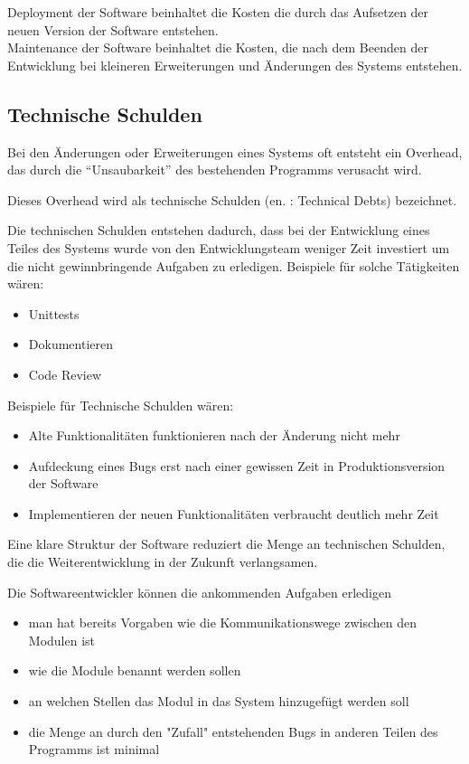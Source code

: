 \documentclass{article}
\begin{document}
    Deployment der Software beinhaltet die Kosten die durch das Aufsetzen der neuen Version der Software entstehen.\\
    Maintenance der Software beinhaltet die Kosten, die nach dem Beenden der Entwicklung bei kleineren Erweiterungen und Änderungen des Systems entstehen.


    \subsection{Technische Schulden}
    Bei den Änderungen oder Erweiterungen eines Systems oft entsteht ein Overhead, das durch die ``Unsaubarkeit'' des bestehenden Programms verusacht wird.

    Dieses Overhead wird als technische Schulden (en. : Technical Debts) bezeichnet.

    Die technischen Schulden entstehen dadurch, dass bei der Entwicklung eines Teiles des Systems wurde 
    von den Entwicklungsteam weniger Zeit investiert um die nicht gewinnbringende Aufgaben zu erledigen.
    Beispiele für solche Tätigkeiten wären:
    \begin{itemize}
        \item Unittests
        \item Dokumentieren 
        \item Code Review
    \end{itemize}

    Beispiele für Technische Schulden wären:
    \begin{itemize}
        \item Alte Funktionalitäten funktionieren nach der Änderung nicht mehr
        \item Aufdeckung eines Bugs erst nach einer gewissen Zeit in Produktionsversion der Software
        \item Implementieren der neuen Funktionalitäten verbraucht deutlich mehr Zeit
    \end{itemize}

    Eine klare Struktur der Software reduziert die Menge an technischen Schulden, 
    die die Weiterentwicklung in der Zukunft verlangsamen. 

    Die Softwareentwickler können die ankommenden Aufgaben erledigen
    \begin{itemize}
        \item man hat bereits Vorgaben wie die Kommunikationswege zwischen den Modulen ist
        \item wie die Module benannt werden sollen
        \item an welchen Stellen das Modul in das System hinzugefügt werden soll
        \item die Menge an durch den "Zufall" entstehenden Bugs in anderen Teilen des Programms ist minimal
    \end{itemize}
\end{document}
